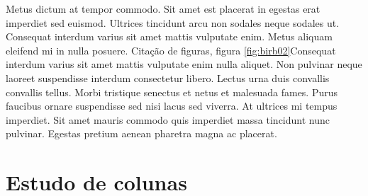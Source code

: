 \documentclass[12pt]{article}
\begin{document}
			Metus dictum at tempor commodo. Sit amet est placerat in egestas erat imperdiet sed euismod. Ultrices tincidunt arcu non sodales neque sodales ut. Consequat interdum varius sit amet mattis vulputate enim. Metus aliquam eleifend mi in nulla posuere. Citação de figuras, figura \ref{fig:birb02}Consequat interdum varius sit amet mattis vulputate enim nulla aliquet. Non pulvinar neque laoreet suspendisse interdum consectetur libero. Lectus urna duis convallis convallis tellus. Morbi tristique senectus et netus et malesuada fames. Purus faucibus ornare suspendisse sed nisi lacus sed viverra. At ultrices mi tempus imperdiet. Sit amet mauris commodo quis imperdiet massa tincidunt nunc pulvinar. Egestas pretium aenean pharetra magna ac placerat.
	\newpage
	
	\section{Estudo de colunas}
\end{document}
